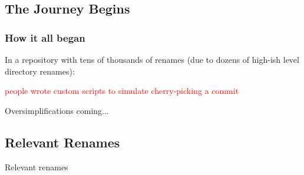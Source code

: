 \documentclass[compress,t]{beamer}
\begin{document}
\subsection[]{The Journey Begins}

\begin{frame}
  \frametitle{How it all began}

  In a repository with tens of thousands of renames (due to dozens of
  high-ish level directory renames):

  \pause
  {\textcolor{red}{
  \begin{center}
    people wrote custom scripts to simulate cherry-picking a commit
  \end{center}
  }}


\end{frame}


\begin{frame}
  \vfill
  \vspace*{2\baselineskip}
  {\Huge
  \begin{center}Oversimplifications coming...\end{center}
  }
  \vfill
\end{frame}

\subsection[Relevance]{Relevant Renames}

\begin{frame}
  \vfill
  \vspace*{2\baselineskip}
  {\Huge
  \begin{center}Relevant renames\end{center}
  }
  \vfill
\end{frame}
\end{document}
